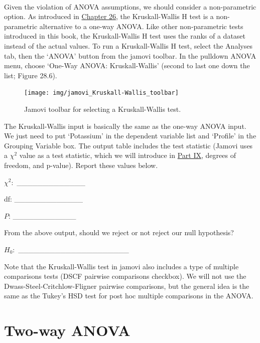 \documentclass[
]{scrbook}
\begin{document}
\begin{verbatim}


\end{verbatim}

Given the violation of ANOVA assumptions, we should consider a non-parametric option.
As introduced in \protect\hyperlink{Chapter_26}{Chapter 26}, the Kruskall-Wallis H test is a non-parametric alternative to a one-way ANOVA.
Like other non-parametric tests introduced in this book, the Kruskall-Wallis H test uses the ranks of a dataset instead of the actual values.
To run a Kruskall-Wallis H test, select the Analyses tab, then the `ANOVA' button from the jamovi toolbar.
In the pulldown ANOVA menu, choose `One-Way ANOVA: Kruskall-Wallis' (second to last one down the list; Figure 28.6).

\begin{figure}
\texttt{[image: img/jamovi\_Kruskall-Wallis\_toolbar]} \caption{Jamovi toolbar for selecting a Kruskall-Wallis test.}\label{fig:unnamed-chunk-133}
\end{figure}

The Kruskall-Wallis input is basically the same as the one-way ANOVA input.
We just need to put `Potassium' in the dependent variable list and `Profile' in the Grouping Variable box.
The output table includes the test statistic (Jamovi uses a \(\chi^{2}\) value as a test statistic, which we will introduce in \protect\hyperlink{Week9}{Part IX}, degrees of freedom, and p-value).
Report these values below.

\(\chi^{2}:\) \_\_\_\_\_\_\_\_\_\_\_\_\_

df: \_\_\_\_\_\_\_\_\_\_\_\_\_

\(P\): \_\_\_\_\_\_\_\_\_\_\_\_

From the above output, should we reject or not reject our null hypothesis?

\(H_{0}:\) \_\_\_\_\_\_\_\_\_\_\_\_\_\_\_\_\_\_\_\_\_

Note that the Kruskall-Wallis test in jamovi also includes a type of multiple comparisons tests (DSCF pairwise comparisons checkbox).
We will not use the Dwass-Steel-Critchlow-Fligner pairwise comparisons, but the general idea is the same as the Tukey's HSD test for post hoc multiple comparisons in the ANOVA.

\hypertarget{two-way-anova}{%
\section{Two-way ANOVA}\label{two-way-anova}}
\end{document}
